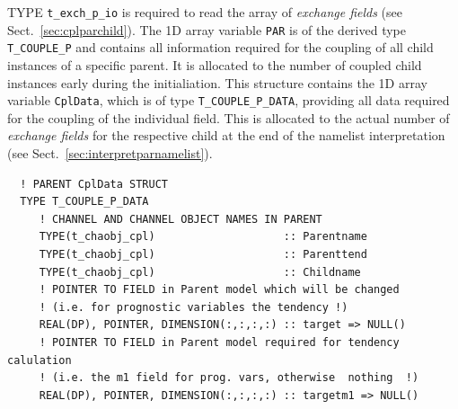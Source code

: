 \documentclass[11pt,twoside]{article}
\begin{document}
TYPE \verb|t_exch_p_io| is required to read the array of {\it exchange fields}
 (see Sect.\ \ref{sec:cplparchild}).
The 1D array variable \verb|PAR| is of the derived type \verb|T_COUPLE_P| 
 and contains all information required for the
coupling of all child instances of a specific parent.
 It is allocated to the number of coupled child instances early during the 
initialiation. This structure contains the 1D array variable \verb|CplData|,
 which is of type \verb|T_COUPLE_P_DATA|, providing all data required for the 
coupling of the individual field. This is allocated to the actual number of 
{\it exchange fields} for the respective child at the end of the
namelist interpretation (see Sect.\ \ref{sec:interpretparnamelist}).
\begin{verbatim}
  ! PARENT CplData STRUCT
  TYPE T_COUPLE_P_DATA
     ! CHANNEL AND CHANNEL OBJECT NAMES IN PARENT  
     TYPE(t_chaobj_cpl)                    :: Parentname
     TYPE(t_chaobj_cpl)                    :: Parenttend
     TYPE(t_chaobj_cpl)                    :: Childname
     ! POINTER TO FIELD in Parent model which will be changed
     ! (i.e. for prognostic variables the tendency !)
     REAL(DP), POINTER, DIMENSION(:,:,:,:) :: target => NULL()
     ! POINTER TO FIELD in Parent model required for tendency calulation
     ! (i.e. the m1 field for prog. vars, otherwise  nothing  !)
     REAL(DP), POINTER, DIMENSION(:,:,:,:) :: targetm1 => NULL()


\end{verbatim}
\end{document}
